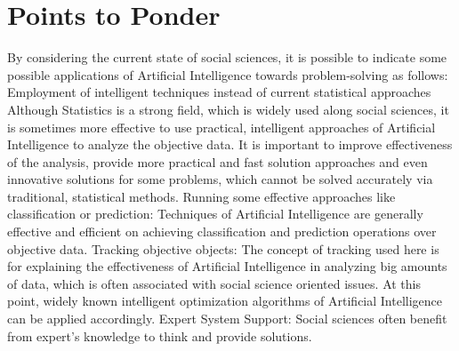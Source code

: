 \documentclass[10pt,a4paper,twoside]{article}
\begin{document}
\section{Points to Ponder}

By considering the current state of social sciences, it is possible to indicate some possible applications of Artificial Intelligence towards problem-solving as follows:
  Employment of intelligent techniques instead of current statistical approaches
 Although Statistics is a strong field, which is widely used along social sciences, it is sometimes more effective to use practical, intelligent approaches of Artificial Intelligence to analyze the objective data.
It is important to improve effectiveness of the analysis, provide more practical and fast solution approaches and even innovative solutions for some problems, which cannot be solved accurately via traditional, statistical methods.
 Running some effective approaches like classification or prediction: Techniques of Artificial Intelligence are generally effective and efficient on achieving classification and prediction operations over objective data.
 Tracking objective objects: The concept of tracking used here is for explaining the effectiveness of Artificial Intelligence in analyzing big amounts of data, which is often associated with social science oriented issues.
At this point, widely known intelligent optimization algorithms of Artificial Intelligence can be applied accordingly.
 Expert System Support: Social sciences often benefit from expert’s knowledge to think and provide solutions.
\end{document}
